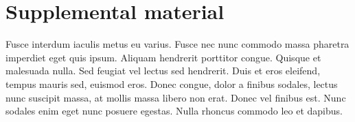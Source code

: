 \documentclass[a4paper,12pt,stu,donotrepeattitle,floatsintext,twoside]{apa7}
\begin{document}
\section{Supplemental material}\label{app:C}

\appindent Fusce interdum iaculis metus eu varius. Fusce nec nunc commodo massa pharetra imperdiet eget quis ipsum. Aliquam hendrerit porttitor congue. Quisque et malesuada nulla. Sed feugiat vel lectus sed hendrerit. Duis et eros eleifend, tempus mauris sed, euismod eros. Donec congue, dolor a finibus sodales, lectus nunc suscipit massa, at mollis massa libero non erat. Donec vel finibus est. Nunc sodales enim eget nunc posuere egestas. Nulla rhoncus commodo leo et dapibus.
\end{document}
